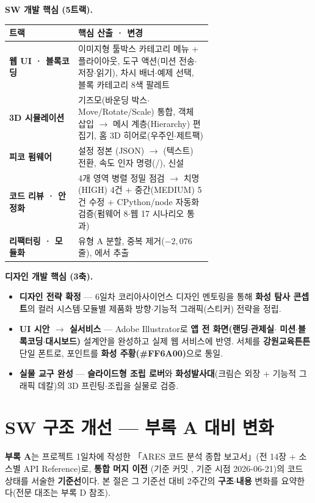 \smallskip
\noindent\textbf{SW 개발 핵심 (5트랙).}
\begin{center}
\renewcommand{\arraystretch}{1.3}
\begin{tabularx}{\linewidth}{@{}>{\sffamily\bfseries}l L{0.66\linewidth}@{}}
\toprule
트랙 & 핵심 산출 · 변경 \\
\midrule
웹 UI · 블록코딩 & 이미지형 툴박스 카테고리 메뉴 + 플라이아웃, 도구 액션(미션 전송$\cdot$저장$\cdot$읽기), 차시 배너$\cdot$예제 선택, 블록 카테고리 8색 팔레트 \\
3D 시뮬레이션 & 기즈모(바운딩 박스$\cdot$Move/Rotate/Scale) 통합, 객체 삽입 $\to$ 메시 계층(Hierarchy) 편집기, 홈 3D 히어로(우주인$\cdot$제트팩) \\
피코 펌웨어 & 설정 정본 (JSON) $\to$ (텍스트) 전환, 속도 인자 명령(/),  신설 \\
코드 리뷰 · 안정화 & 4개 영역 병렬 정밀 점검 $\to$ 치명(HIGH) 4건 + 중간(MEDIUM) 5건 수정 + CPython/node 자동화 검증(펌웨어 8$\cdot$웹 17 시나리오 통과) \\
리팩터링 · 모듈화 &  유형 A 분할,  중복 제거($-2{,}076$줄), 에서  추출 \\
\bottomrule
\end{tabularx}
\end{center}

\smallskip
\noindent\textbf{디자인 개발 핵심 (3축).}
\begin{itemize}
  \item \textbf{디자인 전략 확정} --- 6일차 코리아사이언스 디자인 멘토링을 통해 \textbf{화성 탐사
  콘셉트}의 컬러 시스템$\cdot$모듈별 제품화 방향$\cdot$기능적 그래픽(스티커) 전략을 정립.
  \item \textbf{UI 시안 $\to$ 실서비스} --- Adobe Illustrator로 \textbf{앱 전 화면(랜딩$\cdot$관제실$\cdot$%
  미션$\cdot$블록코딩$\cdot$대시보드)} 설계안을 완성하고 실제 웹 서비스에 반영. 서체를
  \textbf{강원교육튼튼} 단일 폰트로, 포인트를 \textbf{화성 주황(\#FF6A00)}으로 통일.
  \item \textbf{실물 교구 완성} --- \textbf{슬라이드형 조립 로버}와 \textbf{화성발사대}(크림슨 외장 +
  기능적 그래픽 데칼)의 3D 프린팅$\cdot$조립을 실물로 검증.
\end{itemize}

\section{SW 구조 개선 --- 부록 A 대비 변화}
\textbf{부록 A}는 프로젝트 1일차에 작성한 「ARES 코드 분석 종합 보고서」(전 14장 + 소스별 API
Reference)로, \textbf{통합 머지 이전 }(기준 커밋 , 기준 시점 2026-06-21)의
코드 상태를 서술한 \textbf{기준선}이다. 본 절은 그 기준선 대비 2주간의 \textbf{구조}$\cdot$\textbf{내용}
변화를 요약한다(전문 대조는 부록 D 참조).

